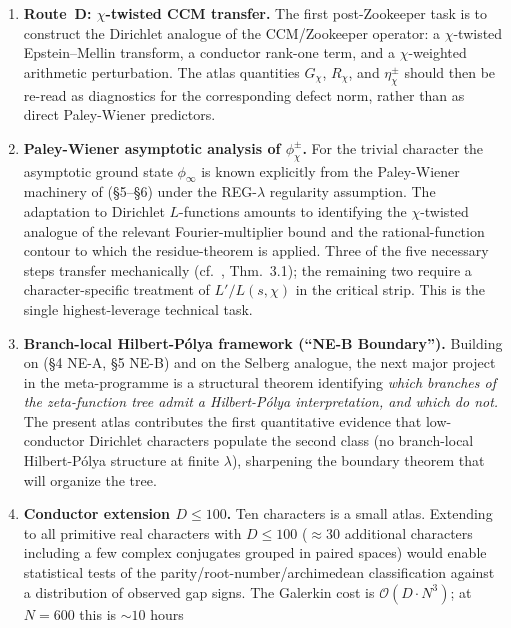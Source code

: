 \documentclass[10pt,twocolumn]{article}
\theoremstyle{definition}
\theoremstyle{remark}
\newcommand{\chifn}{\chi}
\begin{document}
\begin{enumerate}
  \item \textbf{Route~D: $\chifn$-twisted CCM transfer.}
    The first post-Zookeeper task is to construct the Dirichlet
    analogue of the CCM/Zookeeper operator: a $\chifn$-twisted
    Epstein--Mellin transform, a conductor rank-one term, and a
    $\chifn$-weighted arithmetic perturbation. The atlas quantities
    $G_{\chifn}$, $R_{\chifn}$, and $\eta^\pm_{\chifn}$ should then
    be re-read as diagnostics for the corresponding defect norm,
    rather than as direct Paley-Wiener predictors.
  \item \textbf{Paley-Wiener asymptotic analysis of
    $\phi^\pm_{\chifn}$.}
    For the trivial character the asymptotic ground state
    $\phi_\infty$ is known explicitly from the Paley-Wiener
    machinery of \cite{RH_II} (\S5--\S6) under the
    REG-$\lambda$ regularity assumption. The adaptation to
    Dirichlet $L$-functions amounts to identifying the
    $\chifn$-twisted analogue of the relevant Fourier-multiplier
    bound and the rational-function contour to which the
    residue-theorem is applied. Three of the five necessary steps
    transfer mechanically (cf.\ \cite{AnalyticGroundstate},
    Thm.~3.1); the remaining two require a character-specific
    treatment of $L'/L(s,\chifn)$ in the critical strip. This is
    the single highest-leverage technical task.
  \item \textbf{Branch-local Hilbert-P\'olya framework (``NE-B
    Boundary'').}
    Building on \cite{RH_II} (\S4 NE-A, \S5 NE-B) and on the
    Selberg analogue, the next major project in the meta-programme
    is a structural theorem identifying \emph{which branches of
    the zeta-function tree admit a Hilbert-P\'olya interpretation,
    and which do not.} The present atlas contributes the first
    quantitative evidence that low-conductor Dirichlet characters
    populate the second class (no branch-local Hilbert-P\'olya
    structure at finite $\lambda$), sharpening the boundary
    theorem that will organize the tree.
  \item \textbf{Conductor extension $D\leq 100$.}
    Ten characters is a small atlas. Extending to all primitive
    real characters with $D\leq 100$ ($\approx 30$ additional
    characters including a few complex conjugates grouped in
    paired spaces) would enable statistical tests of the
    parity/root-number/archimedean classification against a
    distribution of observed gap signs. The Galerkin cost is
    $\mathcal{O}(D\cdot N^3)$; at $N=600$ this is $\sim 10$ hours

\end{enumerate}
\end{document}
